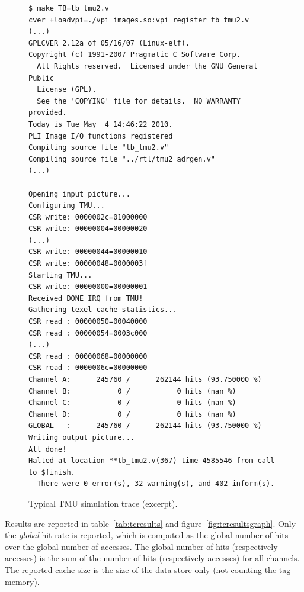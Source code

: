 \documentclass[a4paper,11pt]{kthesis}
\begin{document}
\begin{figure}
\centering
\begin{boxedminipage}{13cm}
\begin{verbatim}
$ make TB=tb_tmu2.v
cver +loadvpi=./vpi_images.so:vpi_register tb_tmu2.v
(...)
GPLCVER_2.12a of 05/16/07 (Linux-elf).
Copyright (c) 1991-2007 Pragmatic C Software Corp.
  All Rights reserved.  Licensed under the GNU General Public
  License (GPL).
  See the 'COPYING' file for details.  NO WARRANTY provided.
Today is Tue May  4 14:46:22 2010.
PLI Image I/O functions registered
Compiling source file "tb_tmu2.v"
Compiling source file "../rtl/tmu2_adrgen.v"
(...)

Opening input picture...
Configuring TMU...
CSR write: 0000002c=01000000
CSR write: 00000004=00000020
(...)
CSR write: 00000044=00000010
CSR write: 00000048=0000003f
Starting TMU...
CSR write: 00000000=00000001
Received DONE IRQ from TMU!
Gathering texel cache statistics...
CSR read : 00000050=00040000
CSR read : 00000054=0003c000
(...)
CSR read : 00000068=00000000
CSR read : 0000006c=00000000
Channel A:      245760 /      262144 hits (93.750000 %)
Channel B:           0 /           0 hits (nan %)
Channel C:           0 /           0 hits (nan %)
Channel D:           0 /           0 hits (nan %)
GLOBAL   :      245760 /      262144 hits (93.750000 %)
Writing output picture...
All done!
Halted at location **tb_tmu2.v(367) time 4585546 from call
to $finish.
  There were 0 error(s), 32 warning(s), and 402 inform(s).
\end{verbatim}
\end{boxedminipage}
\caption{Typical TMU simulation trace (excerpt).}
\label{fig:tmusimtrace}
\end{figure}

Results are reported in table~\ref{tab:tcresults} and figure~\ref{fig:tcresultsgraph}. Only the \textit{global} hit rate is reported, which is computed as the global number of hits over the global number of accesses. The global number of hits (respectively  accesses) is the sum of the number of hits (respectively accesses) for all channels. The reported cache size is the size of the data store only (not counting the tag memory).
\end{document}
